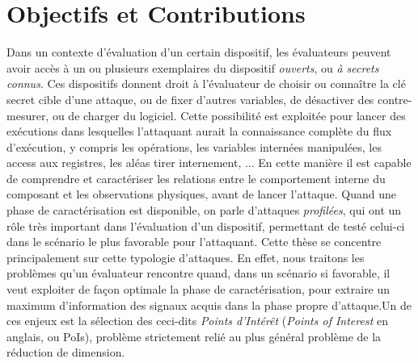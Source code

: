 
\section{Objectifs et Contributions}\label{sec:obj}
Dans un contexte d'\'{e}valuation d'un certain dispositif, les \'{e}valuateurs peuvent avoir acc\`{e}s \`{a} un ou plusieurs exemplaires du dispositif \emph{ouverts}, ou \emph{\`{a} secrets connus}. Ces dispositifs donnent droit \`{a} l'\'{e}valuateur de choisir ou conna\^{i}tre la cl\'{e} secret cible d'une attaque, ou de fixer d'autres variables, de d\'{e}sactiver des contre-mesurer, ou de charger du logiciel. Cette possibilit\'{e} est exploit\'{e}e pour lancer des ex\'{e}cutions dans lesquelles l'attaquant aurait la connaissance compl\`{e}te du flux d'ex\'{e}cution, y compris les op\'{e}rations, les variables intern\'{e}es manipul\'{e}es, les access aux registres, les al\'{e}as tirer internement, ... En cette mani\`{e}re il est capable de comprendre et caract\'{e}riser les relations entre le comportement interne du composant et les observations physiques, avant de lancer l'attaque. Quand une phase de caract\'{e}risation est disponible, on parle d'attaques \emph{profil\'{e}es}, qui ont un r\^{o}le tr\`{e}s important dans l'\'{e}valuation d'un dispositif, permettant de test\'{e} celui-ci dans le sc\'{e}nario le plus favorable pour l'attaquant. Cette th\`{e}se se concentre principalement sur cette typologie d'attaques. En effet, nous traitons les probl\`{e}mes qu'un \'{e}valuateur rencontre quand, dans un sc\'{e}nario si favorable, il veut exploiter de façon optimale la phase de caract\'{e}risation, pour extraire un maximum d'information des signaux acquis dans la phase propre d'attaque.Un de ces enjeux est la s\'{e}lection des ceci-dits \emph{Points d'Int\'{e}r\^{e}t} (\emph{Points of Interest} en anglais, ou PoIs), probl\`{e}me strictement reli\'{e} au plus g\'{e}n\'{e}ral probl\`{e}me de la r\'{e}duction de dimension.

